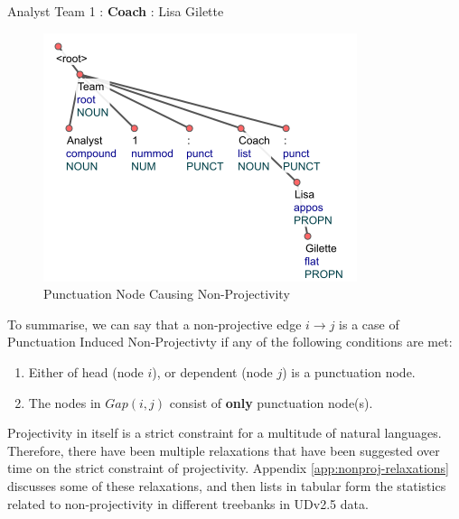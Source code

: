 \begin{example}
Analyst Team 1 : \textbf{Coach} : Lisa Gilette
\end{example}

\begin{figure}[H]
    \centering
    \includegraphics{img/punct-nonproj2.png}
    \caption{Punctuation Node Causing Non-Projectivity}
    \label{fig:punct-nonproj2}
\end{figure}

To summarise, we can say that a non-projective edge \(i \rightarrow j\) is a case of Punctuation Induced Non-Projectivty if any of the following conditions are met:

\begin{enumerate}
    \item Either of head (node \(i\)), or dependent (node \(j\)) is a punctuation node.
    \item The nodes in \(Gap(i, j)\) consist of \textbf{only} punctuation node(s).
\end{enumerate}

Projectivity in itself is a strict constraint for a multitude of natural languages. Therefore, there have been multiple relaxations that have been suggested over time on the strict constraint of projectivity. Appendix \ref{app:nonproj-relaxations} discusses some of these relaxations, and then lists in tabular form the statistics related to non-projectivity in different treebanks in UDv2.5 data.